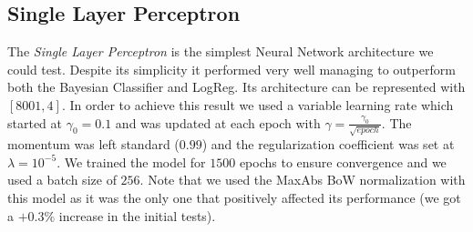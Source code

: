 \documentclass[10pt,a4paper]{report}
\begin{document}
\subsection{Single Layer Perceptron}
The \textit{Single Layer Perceptron} is the simplest Neural Network architecture we could test. Despite its simplicity it performed very well managing to outperform both the Bayesian Classifier and LogReg. Its architecture can be represented with $[8001, 4]$. In order to achieve this result we used a variable learning rate which started at $\gamma_0=0.1$ and was updated at each epoch with $\gamma=\frac{\gamma_0}{\sqrt{epoch}}$. The momentum was left standard ($0.99$) and the regularization coefficient was set at $\lambda=10^{-5}$. We trained the model for $1500$ epochs to ensure convergence and we used a batch size of $256$. Note that we used the MaxAbs BoW normalization with this model as it was the only one that positively affected its performance (we got a $+0.3 \%$ increase in the initial tests).
\end{document}
